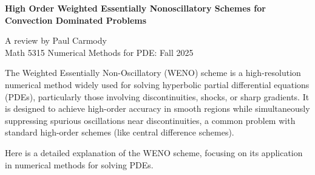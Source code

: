 \documentclass[10pt,a4paper]{article}
\begin{document}
\begin{center}
	\textbf{\Large{High Order Weighted
Essentially Nonoscillatory
Schemes for \\Convection
Dominated Problems}}
\end{center}
\begin{center}
	A review by Paul Carmody\\Math 5315 Numerical Methods for PDE: Fall 2025
\end{center}

\HLINE
\begin{abstract}
	Provide a synapses and understanding of the article ``High Order Weighted
Essentially Nonoscillatory
Schemes for Convection
Dominated Problems" by Chi-Wang Shu.  The background and motivation for the WENO process is described along with its foundation in ENO (and its limitations).  The WENO methodology is then described in a step by step manner.  We measure than the behavior of the non-linear weights (decribed below).  This article ends with a discussion measuring the merits, advantages and disadvantages of this approach.
\end{abstract}

\HLINE
The Weighted Essentially Non-Oscillatory (WENO) scheme is a high-resolution numerical method widely used for solving hyperbolic partial differential equations (PDEs), particularly those involving discontinuities, shocks, or sharp gradients.\cite{weno} It is designed to achieve high-order accuracy in smooth regions while simultaneously suppressing spurious oscillations near discontinuities, a common problem with standard high-order schemes (like central difference schemes).

Here is a detailed explanation of the WENO scheme, focusing on its application in numerical methods for solving PDEs.
\end{document}
